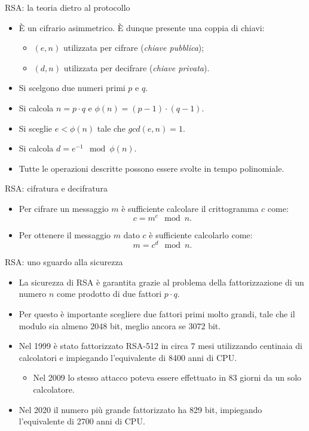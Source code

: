 \documentclass[11pt,svgnames,smaller,aspectratio=169,italian]{beamer}
\begin{document}
\begin{frame}{RSA: la teoria dietro al protocollo}
	\begin{itemize}
		\item È un cifrario asimmetrico. È dunque presente una coppia di chiavi:
		\begin{itemize}
			\item $(e, n)$ utilizzata per cifrare (\emph{chiave pubblica});
			\item $(d, n)$ utilizzata per decifrare (\emph{chiave privata}).
		\end{itemize}
		\item Si scelgono due numeri primi $p$ e $q$.
		\item Si calcola $n = p \cdot q$ e $\phi(n) = (p - 1) \cdot (q - 1)$.
		\item Si sceglie $e < \phi(n)$ tale che $gcd(e, n) = 1$.
		\item Si calcola $d = e^{-1} \mod \phi(n)$.
		\item Tutte le operazioni descritte possono essere svolte in tempo polinomiale.
	\end{itemize}
\end{frame}

\begin{frame}{RSA: cifratura e decifratura}
	\begin{itemize}
		\item Per cifrare un messaggio $m$ è sufficiente calcolare il crittogramma $c$ come:
		\begin{equation*}
			c = m^{e} \mod n.
		\end{equation*}
		\item Per ottenere il messaggio $m$ dato $c$ è sufficiente calcolarlo come:
		\begin{equation*}
			m = c^{d} \mod n.
		\end{equation*}
		
	\end{itemize}
	
\end{frame}

\begin{frame}{RSA: uno sguardo alla sicurezza}
	\begin{itemize}
		\item La sicurezza di RSA è garantita grazie al problema della fattorizzazione di un numero $n$ come prodotto di due fattori $p \cdot q$.
		\item Per questo è importante scegliere due fattori primi molto grandi, tale che il modulo sia almeno $2048$ bit, meglio ancora se $3072$ bit.
		\item Nel 1999 è stato fattorizzato RSA-512 in circa $7$ mesi utilizzando centinaia di calcolatori e impiegando l'equivalente di 8400 anni di CPU.
			\begin{itemize}
				\item Nel 2009 lo stesso attacco poteva essere effettuato in 83 giorni da un solo calcolatore.
			\end{itemize}
		\item Nel 2020 il numero più grande fattorizzato ha 829 bit, impiegando l'equivalente di 2700 anni di CPU.
	\end{itemize}
\end{frame}
\end{document}
